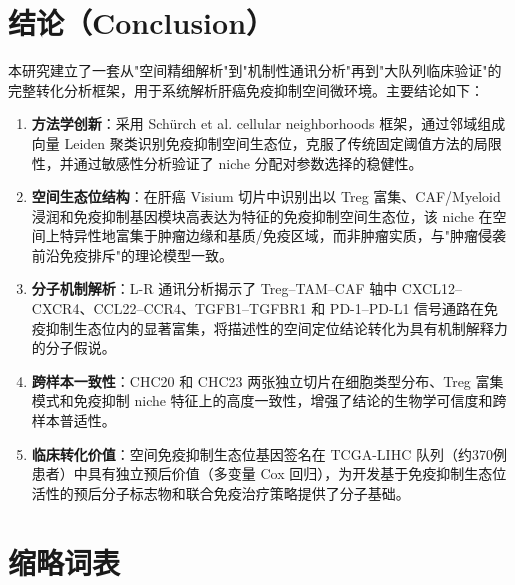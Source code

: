 \documentclass[12pt, a4paper]{ctexart}
\begin{document}
\section{结论（Conclusion）}

本研究建立了一套从"空间精细解析"到"机制性通讯分析"再到"大队列临床验证"的完整转化分析框架，用于系统解析肝癌免疫抑制空间微环境。主要结论如下：

\begin{enumerate}[label=\textbf{（\arabic*）}]
    \item \textbf{方法学创新}：采用 Schürch et al. cellular neighborhoods 框架，通过邻域组成向量 Leiden 聚类识别免疫抑制空间生态位，克服了传统固定阈值方法的局限性，并通过敏感性分析验证了 niche 分配对参数选择的稳健性。
    \item \textbf{空间生态位结构}：在肝癌 Visium 切片中识别出以 Treg 富集、CAF/Myeloid 浸润和免疫抑制基因模块高表达为特征的免疫抑制空间生态位，该 niche 在空间上特异性地富集于肿瘤边缘和基质/免疫区域，而非肿瘤实质，与"肿瘤侵袭前沿免疫排斥"的理论模型一致。
    \item \textbf{分子机制解析}：L-R 通讯分析揭示了 Treg--TAM--CAF 轴中 CXCL12--CXCR4、CCL22--CCR4、TGFB1--TGFBR1 和 PD-1--PD-L1 信号通路在免疫抑制生态位内的显著富集，将描述性的空间定位结论转化为具有机制解释力的分子假说。
    \item \textbf{跨样本一致性}：CHC20 和 CHC23 两张独立切片在细胞类型分布、Treg 富集模式和免疫抑制 niche 特征上的高度一致性，增强了结论的生物学可信度和跨样本普适性。
    \item \textbf{临床转化价值}：空间免疫抑制生态位基因签名在 TCGA-LIHC 队列（约370例患者）中具有独立预后价值（多变量 Cox 回归），为开发基于免疫抑制生态位活性的预后分子标志物和联合免疫治疗策略提供了分子基础。
\end{enumerate}

\section*{缩略词表}
\end{document}

